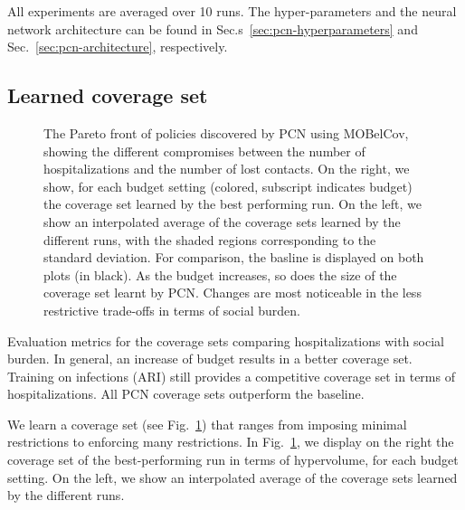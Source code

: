 \documentclass{article}
\newcommand{\momdpname}{MOBelCov}
\begin{document}
All experiments are averaged over 10 runs. The hyper-parameters and the neural network architecture can be found in Sec.s~\ref{sec:pcn-hyperparameters} and Sec.~\ref{sec:pcn-architecture}, respectively.


\subsection{Learned coverage set}

\begin{figure}
    \centering
    
    \caption{The Pareto front of policies discovered by PCN using \momdpname, showing the different compromises between the number of hospitalizations and the number of lost contacts. On the right, we show, for each budget setting (colored, subscript indicates budget) the coverage set learned by the best performing run. On the left, we show an interpolated average of the coverage sets learned by the different runs, with the shaded regions corresponding to the standard deviation. For comparison, the basline is displayed on both plots (in black). As the budget increases, so does the size of the coverage set learnt by PCN. Changes are most noticeable in the less restrictive trade-offs in terms of social burden.}
    \label{fig:pf-binomial-arh-budgets}
\end{figure}

\begin{table}[t]
    \centering
    \setlength{\tabcolsep}{0.5em} %
    {\renewcommand{\arraystretch}{1.2}%
    
    }
    \caption{Evaluation metrics for the coverage sets comparing hospitalizations with social burden. In general, an increase of budget results in a better coverage set. Training on infections (ARI) still provides a competitive coverage set in terms of hospitalizations. All PCN coverage sets outperform the baseline.}
    \label{tab:coverage-set}
  \end{table}

We learn a coverage set (see Fig.~\ref{fig:pf-binomial-arh-budgets}) that ranges from imposing minimal restrictions to enforcing many restrictions. In Fig.~\ref{fig:pf-binomial-arh-budgets}, we display on the right the coverage set of the best-performing run in terms of hypervolume, for each budget setting. On the left, we show an interpolated average of the coverage sets learned by the different runs.
\end{document}
